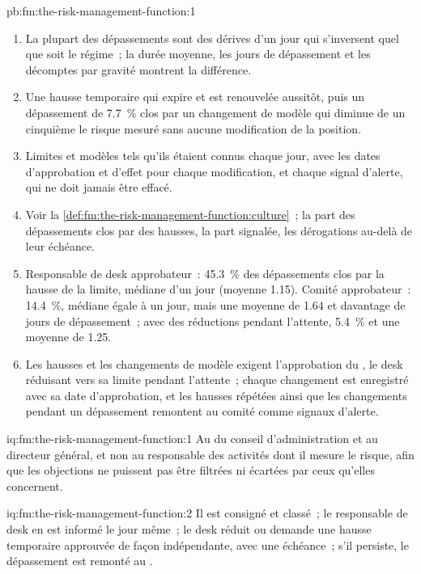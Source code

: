 \begin{solution}{pb:fm:the-risk-management-function:1}
\begin{enumerate}
\item La plupart des dépassements sont des dérives d'un jour qui s'inversent quel que soit le régime~; la durée moyenne, les jours de dépassement et les décomptes par gravité montrent la
différence.
\item Une hausse temporaire qui expire et est renouvelée aussitôt, puis un dépassement de 7.7~\% clos par un changement de modèle qui diminue de
un cinquième le risque mesuré sans aucune modification de la position.
\item Limites et modèles tels qu'ils étaient connus chaque jour, avec les dates d'approbation et d'effet pour chaque modification, et chaque signal d'alerte, qui ne doit jamais être effacé.
\item Voir la \cref{def:fm:the-risk-management-function:culture}~; la part des dépassements clos par des hausses, la part signalée, les dérogations au-delà de leur
échéance.
\item Responsable de desk approbateur~: 45.3~\% des dépassements clos par la hausse de la limite, médiane d'un jour (moyenne 1.15). Comité approbateur~: 14.4~\%, médiane égale à un
jour, mais une moyenne de 1.64 et davantage de jours de dépassement~; avec des réductions pendant l'attente, 5.4~\% et une moyenne de 1.25.
\item Les hausses et les changements de modèle exigent l'approbation du , le desk réduisant vers sa limite pendant l'attente~; chaque changement est
enregistré avec sa date d'approbation, et les hausses répétées ainsi que les changements pendant un dépassement remontent au comité comme signaux d'alerte.
\end{enumerate}
\end{solution}

\begin{solution}{iq:fm:the-risk-management-function:1}
Au  du conseil d'administration et au directeur général, et non au responsable des activités dont il mesure le risque, afin que les objections ne puissent
pas être filtrées ni écartées par ceux qu'elles concernent.
\end{solution}

\begin{solution}{iq:fm:the-risk-management-function:2}
Il est consigné et classé~; le responsable de desk en est informé le jour même~; le desk réduit ou demande une hausse temporaire approuvée de façon indépendante, avec une
échéance~; s'il persiste, le dépassement est remonté au .
\end{solution}

